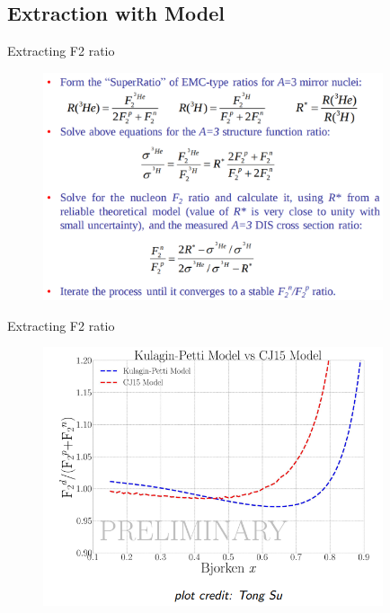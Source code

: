 \documentclass[12pt]{beamer}
\begin{document}
\fi

\subsection[Extraction with Model]{Extraction with Model}
\begin{frame}{Extracting F2 ratio}

\begin{figure}
	\includegraphics[width=10cm]{../images/f2ext.png}
\end{figure}
\end{frame}

\begin{frame}{Extracting F2 ratio}
\vspace{-10pt}
\begin{figure}
	\includegraphics[width=10cm]{../images/kp_cj.png}
\end{figure}
\end{frame}
\end{document}
